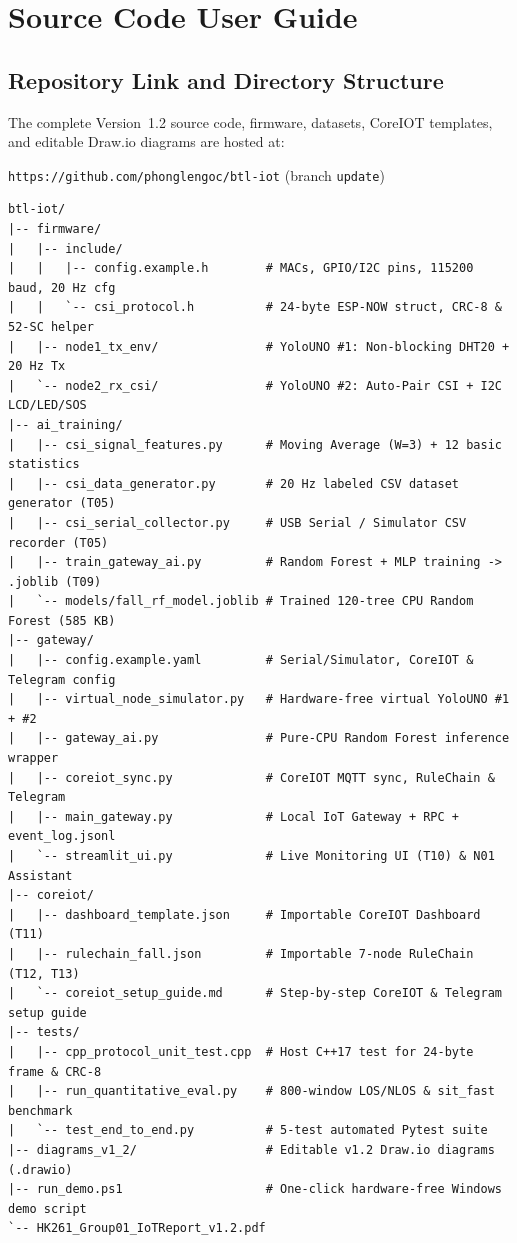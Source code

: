 \documentclass{hcmut-report}
\begin{document}
\section{Source Code User Guide}

\subsection{Repository Link and Directory Structure}
The complete Version~1.2 source code, firmware, datasets, CoreIOT templates, and editable Draw.io diagrams are hosted at:
\begin{center}
\texttt{https://github.com/phonglengoc/btl-iot} \quad (branch \texttt{update})
\end{center}

\begin{lstlisting}[caption={Streamlined Version~1.2 Repository Structure}, label={lst:repo_tree}]
btl-iot/
|-- firmware/
|   |-- include/
|   |   |-- config.example.h        # MACs, GPIO/I2C pins, 115200 baud, 20 Hz cfg
|   |   `-- csi_protocol.h          # 24-byte ESP-NOW struct, CRC-8 & 52-SC helper
|   |-- node1_tx_env/               # YoloUNO #1: Non-blocking DHT20 + 20 Hz Tx
|   `-- node2_rx_csi/               # YoloUNO #2: Auto-Pair CSI + I2C LCD/LED/SOS
|-- ai_training/
|   |-- csi_signal_features.py      # Moving Average (W=3) + 12 basic statistics
|   |-- csi_data_generator.py       # 20 Hz labeled CSV dataset generator (T05)
|   |-- csi_serial_collector.py     # USB Serial / Simulator CSV recorder (T05)
|   |-- train_gateway_ai.py         # Random Forest + MLP training -> .joblib (T09)
|   `-- models/fall_rf_model.joblib # Trained 120-tree CPU Random Forest (585 KB)
|-- gateway/
|   |-- config.example.yaml         # Serial/Simulator, CoreIOT & Telegram config
|   |-- virtual_node_simulator.py   # Hardware-free virtual YoloUNO #1 + #2
|   |-- gateway_ai.py               # Pure-CPU Random Forest inference wrapper
|   |-- coreiot_sync.py             # CoreIOT MQTT sync, RuleChain & Telegram
|   |-- main_gateway.py             # Local IoT Gateway + RPC + event_log.jsonl
|   `-- streamlit_ui.py             # Live Monitoring UI (T10) & N01 Assistant
|-- coreiot/
|   |-- dashboard_template.json     # Importable CoreIOT Dashboard (T11)
|   |-- rulechain_fall.json         # Importable 7-node RuleChain (T12, T13)
|   `-- coreiot_setup_guide.md      # Step-by-step CoreIOT & Telegram setup guide
|-- tests/
|   |-- cpp_protocol_unit_test.cpp  # Host C++17 test for 24-byte frame & CRC-8
|   |-- run_quantitative_eval.py    # 800-window LOS/NLOS & sit_fast benchmark
|   `-- test_end_to_end.py          # 5-test automated Pytest suite
|-- diagrams_v1_2/                  # Editable v1.2 Draw.io diagrams (.drawio)
|-- run_demo.ps1                    # One-click hardware-free Windows demo script
`-- HK261_Group01_IoTReport_v1.2.pdf
\end{lstlisting}
\end{document}
